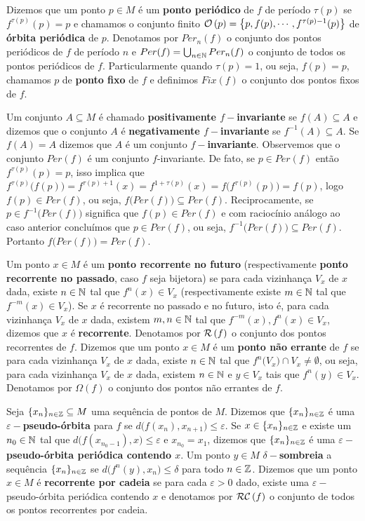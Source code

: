 Dizemos que um ponto $p\in M$ é um \textbf{ponto periódico} de $f$ de período $\tau(p)$ se $f^{\tau(p)}(p)=p$ e chamamos o conjunto finito $\mathcal{O}\left(p\right)=\big\{p,f(p),\cdots,f^{\tau(p)-1}(p)\big\}$ de \textbf{órbita periódica} de $p$. Denotamos por $Per_n(f)$ o conjunto dos pontos periódicos de $f$ de período $n$ e $Per(f)=\bigcup_{n\in\mathbb{N}} Per_n(f)$ o conjunto de todos os pontos periódicos de $f$. Particularmente quando $\tau(p)=1$, ou seja, $f(p)=p$, chamamos $p$ de \textbf{ponto fixo} de $f$ e definimos $Fix(f)$ o conjunto dos pontos fixos de $f$.

Um conjunto $A\subseteq M$ é chamado \textbf{positivamente $f-$invariante} se $f(A)\subseteq A$ e dizemos que o conjunto $A$ é \textbf{negativamente $f-$invariante} se $f^{-1}(A)\subseteq A$. Se $f(A)=A$ dizemos que $A$ é um conjunto \textbf{$f-$invariante}. Observemos que o conjunto $Per(f)$ é um conjunto $f$-invariante. De fato, se $p\in Per(f)$ então $f^{\tau(p)}(p)=p$, isso implica que $f^{\tau(p)}\big(f(p)\big)=f^{\tau(p)+1}(x)=f^{1+\tau(p)}(x)=f\big(f^{\tau(p)}(p)\big)=f(p)$, logo $f(p)\in Per(f)$, ou seja, $f\big(Per(f)\big)\subseteq Per(f)$. Reciprocamente, se $p\in f^{-1}\big(Per(f)\big)$ significa que $f(p)\in Per(f)$ e com raciocínio análogo ao caso anterior concluímos que $p\in Per(f)$, ou seja, $f^{-1}\big(Per(f)\big)\subseteq Per(f)$. Portanto $f\big(Per(f)\big)=Per(f)$. 

Um ponto $x\in M$ é um \textbf{ponto recorrente no futuro} (respectivamente \textbf{ponto recorrente no passado}, caso $f$ seja bijetora) se para cada vizinhança $V_x$ de $x$ dada, existe $n\in\mathbb{N}$ tal que $f^n(x)\in V_x$ (respectivamente existe $m\in\mathbb{N}$ tal que $f^{-m}(x)\in V_x$). Se $x$ é recorrente no passado e no futuro, isto é, para cada vizinhança $V_x$ de $x$ dada, existem $m,n\in\mathbb{N}$ tal que $f^{-m}(x),f^n(x)\in V_x$, dizemos que $x$ é \textbf{recorrente}. Denotamos por $\mathcal{R}\left(f\right)$ o conjunto dos pontos recorrentes de $f$. Dizemos que um ponto $x\in M$ é um \textbf{ponto não errante} de $f$ se para cada vizinhança $V_x$ de $x$ dada, existe $n\in\mathbb{N}$ tal que $f^n\big(V_x\big)\cap V_x\neq\emptyset$, ou seja, para cada vizinhança $V_x$ de $x$ dada, existem $n\in\mathbb{N}$ e $y\in V_x$ tais que $f^n(y)\in V_x$. Denotamos por $\Omega(f)$ o conjunto dos pontos não errantes de $f$.

Seja $\{x_n\}_{n\in\mathbb{Z}}\subseteq M$ uma sequência de pontos de $M$. Dizemos que $\{x_n\}_{n\in\mathbb{Z}}$ é uma \textbf{$\varepsilon-$pseudo-órbita} para $f$ se $d\big(f(x_n),x_{n+1}\big)\leq\varepsilon$. Se $x\in\{x_n\}_{n\in\mathbb{Z}}$ e existe um $n_0\in\mathbb{N}$ tal que $d\big(f(x_{n_0-1}),x\big)\leq\varepsilon$ e $x_{n_0}=x_1$, dizemos que $\{x_n\}_{n\in\mathbb{Z}}$ é uma \textbf{$\varepsilon-$pseudo-órbita periódica contendo $x$}. Um ponto $y\in M$ \textbf{$\delta-$sombreia} a sequência $\{x_n\}_{n\in\mathbb{Z}}$ se $d\big(f^n(y),x_{n}\big)\leq\delta$ para todo $n\in\mathbb{Z}$. Dizemos que um ponto $x\in M$ é \textbf{recorrente por cadeia} se para cada $\varepsilon>0$ dado, existe uma $\varepsilon-$pseudo-órbita periódica contendo $x$ e denotamos por $\mathcal{RC}\left(f\right)$ o conjunto de todos os pontos recorrentes por cadeia.

